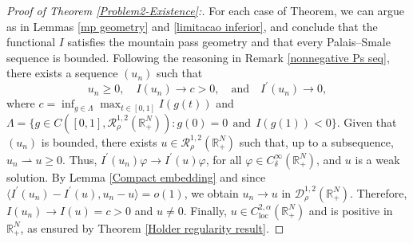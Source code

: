 \documentclass[12pt,reqno]{amsart}
\begin{document}
\begin{proof}[Proof of Theorem \ref{Problem2-Existence}:] 
 For each case of Theorem, we can argue as in Lemmas \ref{mp geometry} and \ref{limitacao inferior}, and conclude that the functional $I$ satisfies the mountain pass geometry and that every Palais–Smale sequence is bounded. Following the reasoning in Remark \ref{nonnegative Ps seq}, there exists a sequence $(u_n)$ such that
 \begin{equation*}
     u_n\geq0,\quad I(u_n)\longrightarrow c>0,\quad\text{and}\quad I^\prime(u_n)\longrightarrow 0,
 \end{equation*}
 where $c=\inf_{g \in \Lambda } \max_{t \in [0,1]}I(g(t))$ and $\Lambda=\{g \in C([0,1], \mathcal{R}^{1,2}_{\rho}(\mathds{R}^N_+)): g(0)=0~~\text{and}~~I(g(1))<0\}$. Given that $(u_n)$ is bounded, there exists $u\in \mathcal{R}^{1,2}_\rho(\mathds{R}^N_+)$ such that, up to a subsequence, $u_n\rightharpoonup u\geq 0$. Thus, $I^\prime(u_n)\varphi\longrightarrow I^\prime(u)\varphi$, for all $\varphi\in C^\infty_\delta(\mathds{R}^N_+)$, and $u$ is a weak solution. By Lemma \ref{Compact embedding} and since $\langle I^\prime(u_n)-I^\prime(u), u_n-u \rangle=o(1)$, we obtain $u_n\longrightarrow u$ in $\mathcal{D}^{1,2}_\rho(\mathds{R}^N_+)$. Therefore, $I(u_n)\longrightarrow I(u)=c>0$ and $u\neq 0$. Finally, $u\in C^{2,\alpha}_{\mathrm{loc}}(\mathds{R}^N_+)$ and is positive in $\mathds{R}^N_+$, as ensured by Theorem \ref{Holder regularity result}. 
\end{proof}
\end{document}
